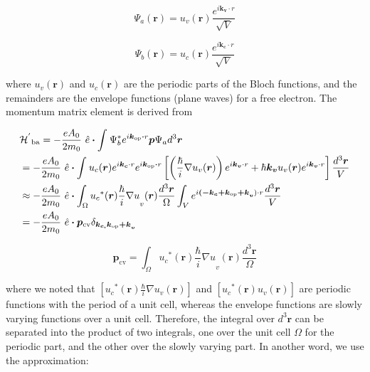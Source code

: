 \begin{equation}
\Psi_{a}\left( \bm{r} \right) = u_{v}(\bm{r})\frac{e^{i\bm{k}_{\bm{v}} \cdot r}}{\sqrt{V}}
\end{equation}

\begin{equation}
\Psi_{b}\left( \bm{r} \right) = u_{c}(\bm{r})\frac{e^{i\bm{k}_{\bm{c}} \cdot r}}{\sqrt{V}}
\end{equation}

where \(u_{v}(\bm{r})\) and \(u_{c}(\bm{r})\) are the periodic
parts of the Bloch functions, and the remainders are the envelope
functions (plane waves) for a free electron. The momentum matrix element
is derived from

\begin{eqnarray}
  & {\HAM^{'}}_{\text{ba}} = - \frac{eA_{0}}{2m_{0}}\bm{\ }\hat{e}\bm{\cdot}\int_{}^{}{\Psi_{b}^{*}e^{i\bm{k}_{\bm{\text{op}}}\bm{\cdot}r}\bm{p}\Psi_{a}d^{3}\bm{r}} \nonumber \\
  & = - \frac{eA_{0}}{2m_{0}}\bm{\ }\hat{e}\bm{\cdot}\int_{}^{}{u_{c}(\bm{r})e^{i\bm{k}_{\bm{c}} \cdot r}e^{i\bm{k}_{\bm{\text{op}}}\bm{\cdot}r}\left\lbrack \left( \frac{\hbar}{i}\nabla u_{v}(\bm{r}) \right)e^{i\bm{k}_{\bm{v}} \cdot r} + \hbar\bm{k}_{\bm{v}}u_{v}(\bm{r})e^{i\bm{k}_{\bm{v}} \cdot r} \right\rbrack\frac{d^{3}\bm{r}}{V}} \nonumber \\
  & \approx - \frac{eA_{0}}{2m_{0}}\bm{\ }\hat{e}\bm{\cdot}\int_{\Omega}^{}{{u_{c}}^{*}(\bm{r}){\frac{\hbar}{i}\nabla u}_{v}(\bm{r})}\frac{d^{3}\bm{r}}{\Omega}\int_{V}^{}e^{i{\bm{( -}\bm{k}_{\bm{c}}\bm{+}\bm{k}_{\bm{\text{op}}}\bm{+ k}}_{\bm{v}}) \cdot r}\frac{d^{3}\bm{r}}{V} \nonumber \\
  & = - \frac{eA_{0}}{2m_{0}}\bm{\ }\hat{e}\bm{\cdot}\bm{p}_{\text{cv}}\delta_{{\bm{k}_{\bm{c,}}\bm{k}_{\bm{\text{op}}}\bm{+ k}}_{\bm{v}}}
\end{eqnarray}

\begin{equation}
\bm{p}_{\text{cv}}\bm{=}\int_{\Omega}^{}{{u_{c}}^{*}(\bm{r}){\frac{\hbar}{i}\nabla u}_{v}(\bm{r})}\frac{d^{3}\bm{r}}{\Omega}
\end{equation}

where we noted that
\(\left\lbrack {u_{c}}^{*}(\bm{r})\frac{\hbar}{i}\nabla u_{v}(\bm{r}) \right\rbrack\)
and
\(\left\lbrack {u_{c}}^{*}(\bm{r})u_{v}(\bm{r}) \right\rbrack\)
are periodic functions with the period of a unit cell, whereas the
envelope functions are slowly varying functions over a unit cell.
Therefore, the integral over \(d^{3}\bm{r}\) can be separated into
the product of two integrals, one over the unit cell \(\Omega\) for the
periodic part, and the other over the slowly varying part. In another
word, we use the approximation:

